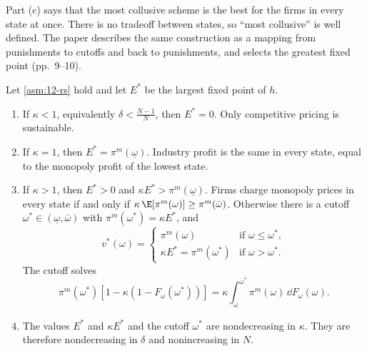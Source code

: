 Part (c) says that the most collusive scheme is the best for the firms in every state at once. There is no tradeoff
between states, so ``most collusive'' is well defined. The paper describes the same construction as a mapping from
punishments to cutoffs and back to punishments, and selects the greatest fixed point (pp.~9--10).

\begin{proposition}\label{prop:12-rs-threshold}
Let \cref{asm:12-rs} hold and let $E^*$ be the largest fixed point of $h$.
\begin{enumerate}[label=(\roman*)]
\item If $\kappa < 1$, equivalently $\delta < \frac{N-1}{N}$, then $E^* = 0$. Only competitive pricing is sustainable.
\item If $\kappa = 1$, then $E^* = \pi^m(\underline\omega)$. Industry profit is the same in every state, equal to the
monopoly profit of the lowest state.
\item If $\kappa > 1$, then $E^* > 0$ and $\kappa E^* > \pi^m(\underline\omega)$. Firms charge monopoly prices in every
state if and only if $\kappa\,\E[\pi^m(\omega)] \ge \pi^m(\bar\omega)$. Otherwise there is a cutoff
$\omega^* \in (\underline\omega, \bar\omega)$ with $\pi^m(\omega^*) = \kappa E^*$, and
\begin{equation}\label{eq:12-rs-schedule}
v^*(\omega) =
\begin{cases}
\pi^m(\omega) & \text{if } \omega \le \omega^*,\\
\kappa E^* = \pi^m(\omega^*) & \text{if } \omega > \omega^* .
\end{cases}
\end{equation}
The cutoff solves
\begin{equation}\label{eq:12-rs-cutoff}
\pi^m(\omega^*)\left[1 - \kappa\left(1 - F_\omega(\omega^*)\right)\right] = \kappa \int_{\underline\omega}^{\omega^*} \pi^m(\omega)\, \dd F_\omega(\omega).
\end{equation}
\item The values $E^*$ and $\kappa E^*$ and the cutoff $\omega^*$ are nondecreasing in $\kappa$. They are therefore
nondecreasing in $\delta$ and nonincreasing in $N$.
\end{enumerate}
\end{proposition}

